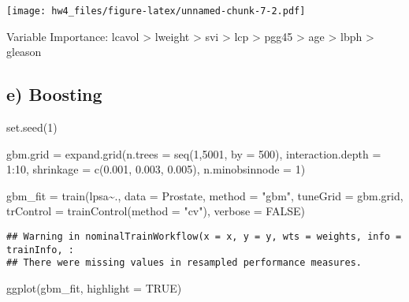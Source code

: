 \documentclass[
]{article}
\newenvironment{Shaded}{\begin{snugshade}}{\end{snugshade}}
\newcommand{\AttributeTok}[1]{\textcolor[rgb]{0.77,0.63,0.00}{#1}}
\newcommand{\ConstantTok}[1]{\textcolor[rgb]{0.00,0.00,0.00}{#1}}
\newcommand{\DecValTok}[1]{\textcolor[rgb]{0.00,0.00,0.81}{#1}}
\newcommand{\FloatTok}[1]{\textcolor[rgb]{0.00,0.00,0.81}{#1}}
\newcommand{\FunctionTok}[1]{\textcolor[rgb]{0.00,0.00,0.00}{#1}}
\newcommand{\NormalTok}[1]{#1}
\newcommand{\OtherTok}[1]{\textcolor[rgb]{0.56,0.35,0.01}{#1}}
\newcommand{\SpecialCharTok}[1]{\textcolor[rgb]{0.00,0.00,0.00}{#1}}
\newcommand{\StringTok}[1]{\textcolor[rgb]{0.31,0.60,0.02}{#1}}
\begin{document}
\texttt{[image: hw4\_files/figure-latex/unnamed-chunk-7-2.pdf]}

Variable Importance: lcavol \textgreater{} lweight \textgreater{} svi
\textgreater{} lcp \textgreater{} pgg45 \textgreater{} age
\textgreater{} lbph \textgreater{} gleason

\hypertarget{e-boosting}{%
\subsection{e) Boosting}\label{e-boosting}}

\begin{Shaded}
\begin{Highlighting}[]
\FunctionTok{set.seed}\NormalTok{(}\DecValTok{1}\NormalTok{)}

\NormalTok{gbm.grid }\OtherTok{=} \FunctionTok{expand.grid}\NormalTok{(}\AttributeTok{n.trees =} \FunctionTok{seq}\NormalTok{(}\DecValTok{1}\NormalTok{,}\DecValTok{5001}\NormalTok{, }\AttributeTok{by =} \DecValTok{500}\NormalTok{),}
                       \AttributeTok{interaction.depth =} \DecValTok{1}\SpecialCharTok{:}\DecValTok{10}\NormalTok{,}
                       \AttributeTok{shrinkage =} \FunctionTok{c}\NormalTok{(}\FloatTok{0.001}\NormalTok{, }\FloatTok{0.003}\NormalTok{, }\FloatTok{0.005}\NormalTok{),}
                       \AttributeTok{n.minobsinnode =} \DecValTok{1}\NormalTok{)}

\NormalTok{gbm\_fit }\OtherTok{=} \FunctionTok{train}\NormalTok{(lpsa}\SpecialCharTok{\textasciitilde{}}\NormalTok{.,}
                \AttributeTok{data =}\NormalTok{ Prostate,}
                \AttributeTok{method =} \StringTok{"gbm"}\NormalTok{,}
                \AttributeTok{tuneGrid =}\NormalTok{ gbm.grid,}
                \AttributeTok{trControl =} \FunctionTok{trainControl}\NormalTok{(}\AttributeTok{method =} \StringTok{"cv"}\NormalTok{),}
                \AttributeTok{verbose =} \ConstantTok{FALSE}\NormalTok{)}
\end{Highlighting}
\end{Shaded}

\begin{verbatim}
## Warning in nominalTrainWorkflow(x = x, y = y, wts = weights, info = trainInfo, :
## There were missing values in resampled performance measures.
\end{verbatim}

\begin{Shaded}
\begin{Highlighting}[]
\FunctionTok{ggplot}\NormalTok{(gbm\_fit, }\AttributeTok{highlight =} \ConstantTok{TRUE}\NormalTok{)}
\end{Highlighting}
\end{Shaded}
\end{document}

